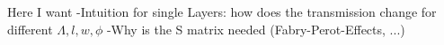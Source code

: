 Here I want -Intuition for single Layers: how does the transmission change for different $\Lambda, l, w, \phi$
-Why is the S matrix needed (Fabry-Perot-Effects, ...)
